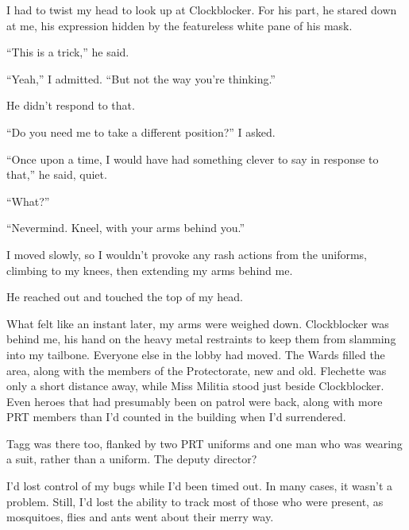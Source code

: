 I had to twist my head to look up at Clockblocker.   For his part, he stared down at me, his expression hidden by the featureless white pane of his mask.



``This is a trick,'' he said.



``Yeah,'' I admitted.  ``But not the way you're thinking.''



He didn't respond to that.



``Do you need me to take a different position?'' I asked.



``Once upon a time, I would have had something clever to say in response to that,'' he said, quiet.



``What?''



``Nevermind.  Kneel, with your arms behind you.''



I moved slowly, so I wouldn't provoke any rash actions from the uniforms, climbing to my knees, then extending my arms behind me.



He reached out and touched the top of my head.



What felt like an instant later, my arms were weighed down.  Clockblocker was behind me, his hand on the heavy metal restraints to keep them from slamming into my tailbone.  Everyone else in the lobby had moved.  The Wards filled the area, along with the members of the Protectorate, new and old.  Flechette was only a short distance away, while Miss Militia stood just beside Clockblocker.  Even heroes that had presumably been on patrol were back, along with more PRT members than I'd counted in the building when I'd surrendered.



Tagg was there too, flanked by two PRT uniforms and one man who was wearing a suit, rather than a uniform.  The deputy director?



I'd lost control of my bugs while I'd been timed out.  In many cases, it wasn't a problem.  Still, I'd lost the ability to track most of those who were present, as mosquitoes, flies and ants went about their merry way.



